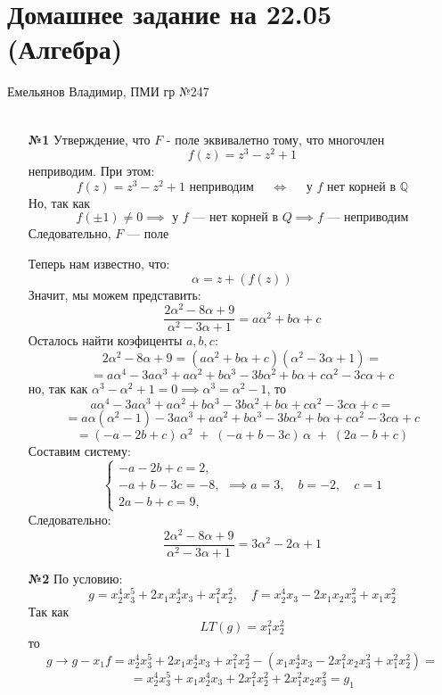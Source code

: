 \documentclass[a4paper]{article}
\renewcommand{\f}[2]{\frac{#1}{#2}}
\newcommand{\lr}{\Leftrightarrow}
\newcommand{\QQ}{\mathbb{Q}}
\begin{document}
\section*{Домашнее задание на 22.05 (Алгебра)}
{\large Емельянов Владимир, ПМИ гр №247}\\\\
\begin{enumerate}
  \item[\textbf{№1}]Утверждение, что $F$ - поле эквивалетно тому, что многочлен
  $$f(z) = z^3 -z^2 + 1$$
  неприводим. При этом:
  $$f(z) = z^3 -z^2 + 1\text{ неприводим } \quad \lr \quad \text{ у $f$ нет корней в $\QQ$}$$
  Но, так как $$f(\pm 1) \neq 0 \implies \text{ у $f$ --- нет корней в $Q$} \implies f \text{ --- неприводим}$$
  Следовательно, $F$ --- поле

  Теперь нам известно, что:
  $$\alpha = z + (f(z))$$
  Значит, мы можем представить:
  $$\f{2\alpha^2 - 8\alpha + 9}{\alpha^2 -3\alpha + 1} = a\alpha^2 + b\alpha + c$$
  Осталось найти коэфиценты $a, b, c$:
  $$2\alpha^2 - 8\alpha + 9= (a\alpha^2 + b\alpha + c)(\alpha^2 -3\alpha + 1)=$$
  $$
  = a\alpha^4 -3a\alpha^3 + a\alpha^2
  + b\alpha^3 -3b\alpha^2 + b\alpha
  + c\alpha^2 -3c\alpha + c
  $$
  но, так как $\alpha^3 -\alpha^2 + 1 = 0 \implies \alpha^3 = \alpha^2 - 1$, то
  $$a\alpha^4 -3a\alpha^3 + a\alpha^2
  + b\alpha^3 -3b\alpha^2 + b\alpha
  + c\alpha^2 -3c\alpha + c =$$
  $$=a\alpha(\alpha^2 - 1) -3a\alpha^3 + a\alpha^2
  + b\alpha^3 -3b\alpha^2 + b\alpha
  + c\alpha^2 -3c\alpha + c $$
  $$= (-a-2b+c)\,\alpha^2\;+\;(-a+b-3c)\,\alpha\;+\;(2a - b + c)$$
  Составим систему:
  $$
  \begin{cases}
  -a-2b+c=2,\\
  -a+b-3c=-8,\\
  2a - b + c=9,
  \end{cases}
  \implies a=3,\quad b=-2,\quad c=1$$
  Следовательно:
  $$\f{2\alpha^2 - 8\alpha + 9}{\alpha^2 -3\alpha + 1} = 3\alpha^2 -2\alpha + 1$$

    \item[\textbf{№2}]
    По условию:
    $$g = x_2^4x_3^5 + 2x_1x_2^4x_3 + x_1^2x_2^2, \quad f = x_2^4x_3 - 2x_1x_2x_3^2 + x_1x_2^2$$
    Так как
    $$LT(g) = x_1^2 x_2^2$$
    то 
    $$g \to g-x_1f = x_2^4x_3^5 + 2x_1x_2^4x_3 + x_1^2x_2^2 - (x_1x_2^4x_3 - 2x_1^2x_2x_3^2 + x_1^2x_2^2) = $$
    $$=x_2^4x_3^5 + x_1x_2^4x_3 +2 x_1^2x_2^2  + 2x_1^2x_2x_3^2 = g_1 $$
    $$$$

\end{enumerate}
\end{document}

